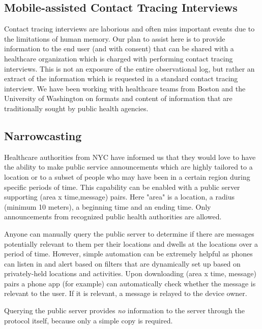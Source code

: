 \documentclass{article}
\begin{document}
\subsection{Mobile-assisted Contact Tracing Interviews} 
Contact tracing interviews are laborious and often miss important events due to the limitations of human memory.  Our plan to assist here is to provide information to the end user (and with consent) that can be shared with a healthcare organization which is charged with performing contact tracing interviews.   This is not an exposure of the entire observational log, but rather an extract of the information which is requested in a standard contact tracing interview. We have been working with healthcare teams from Boston and the University of Washington on formats and content of information that are traditionally sought by public health agencies.

\subsection{Narrowcasting}

Healthcare authorities from NYC have informed us that they would love to have the ability to make public service announcements which are highly tailored to a location or to a subset of people who may have been in a certain region during specific periods of time.  This capability can be enabled with a public server supporting (area x time,message) pairs.  Here "area" is a location, a radius (minimum 10 meters), a beginning time and an ending time.  Only announcements from recognized public health authorities are allowed.  

Anyone can manually query the public server to determine if there are messages potentially relevant to them per their locations and dwells at the locations over a period of time. However, simple automation can be extremely helpful as phones can listen in and alert based on filters that are dynamically set up based on privately-held locations and activities. Upon downloading (area x time, message) pairs a phone app (for example) can automatically check whether the message is relevant to the user.  If it is relevant, a message is relayed to the device owner.

Querying the public server provides \emph{no} information to the server through the protocol itself, because only a simple copy is required.  
\end{document}
